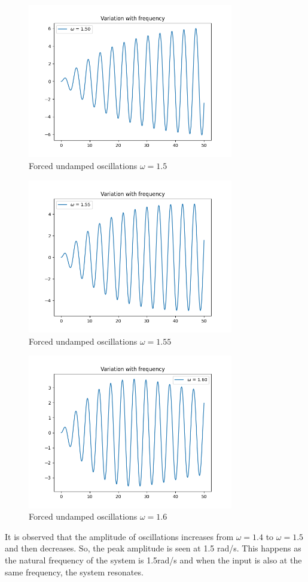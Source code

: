 \documentclass[12pt, a4paper]{article}
\begin{document}
\begin{figure}[H]
\centering
\includegraphics[width=0.8\textwidth]{Figure_5.png}
\caption{Forced undamped oscillations $\omega = 1.5$}
\end{figure}
\begin{figure}[H]
\centering
\includegraphics[width=0.8\textwidth]{Figure_6.png}
\caption{Forced undamped oscillations $\omega = 1.55$}
\end{figure}
\begin{figure}[H]
\centering
\includegraphics[width=0.8\textwidth]{Figure_7.png}
\caption{Forced undamped oscillations $\omega = 1.6$}
\end{figure}
It is observed that the amplitude of oscillations increases from $\omega = 1.4$ to $\omega = 1.5$ and then decreases. So, the peak amplitude is seen at 1.5 rad/s. This happens as the natural frequency of the system is 1.5rad/s and when the input is also at the same frequency, the system resonates.
\end{document}

